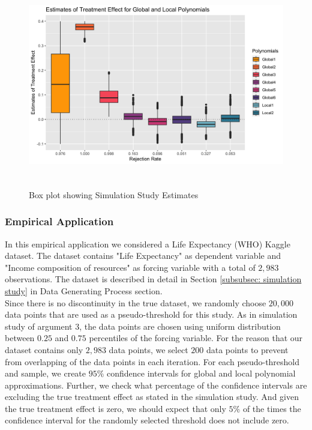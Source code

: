 \documentclass[fleqn]{article}
\begin{document}
    \begin{figure}[h]
        \centering
        \includegraphics[width = 16cm,height = 9cm]{rdd_arg3.png}
        \caption{Box plot showing Simulation Study Estimates}
        \label{fig:rdd}
    \end{figure}

    \subsubsection{Empirical Application}
    \label{subsubsec: arg3 emp app}

    In this empirical application we considered a Life Expectancy (WHO) Kaggle\cite{kumar2018life} dataset. The dataset contains "Life Expectancy" as dependent variable and "Income composition of resources" as forcing variable with a total of $2,983$ observations. The dataset is described in detail in Section \ref{subsubsec: simulation study} in Data Generating Process section. \\

    Since there is no discontinuity in the true dataset, we randomly choose $20,000$ data points that are used as a pseudo-threshold for this study. As in simulation study of argument 3, the data points are chosen using uniform distribution between $0.25$ and $0.75$ percentiles of the forcing variable. For the reason that our dataset contains only $2,983$ data points, we select $200$ data points to prevent from overlapping of the data points in each iteration. For each pseudo-threshold and sample, we create $95\%$ confidence intervals for global and local polynomial approximations. Further, we check what percentage of the confidence intervals are excluding the true treatment effect as stated in the simulation study. And given the true treatment effect is zero, we should expect that only $5\%$ of the times the confidence interval for the randomly selected threshold does not include zero. \\
\end{document}
